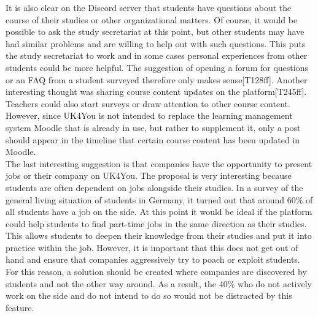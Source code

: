It is also clear on the Discord server that students have questions about the course of their studies or other organizational matters.
Of course, it would be possible to ask the study secretariat at this point, but other students may have had similar problems and are willing to help out with such questions.
This puts the study secretariat to work and in some cases personal experiences from other students could be more helpful.
The suggestion of opening a forum for questions or an FAQ from a student surveyed therefore only makes sense[T128ff].
Another interesting thought was sharing course content updates on the platform[T245ff].
Teachers could also start surveys or draw attention to other course content.
However, since UK4You is not intended to replace the learning management system Moodle that is already in use, but rather to supplement it, only a post should appear in the timeline that certain course content has been updated in Moodle.\\

The last interesting suggestion is that companies have the opportunity to present jobs or their company on UK4You.
The proposal is very interesting because students are often dependent on jobs alongside their studies.
In a survey of the general living situation of students in Germany, it turned out that around 60\% of all students have a job on the side\cite{students-work}.
At this point it would be ideal if the platform could help students to find part-time jobs in the same direction as their studies.
This allows students to deepen their knowledge from their studies and put it into practice within the job.
However, it is important that this does not get out of hand and ensure that companies aggressively try to poach or exploit students.
For this reason, a solution should be created where companies are discovered by students and not the other way around.
As a result, the 40\% who do not actively work on the side and do not intend to do so would not be distracted by this feature.\\

